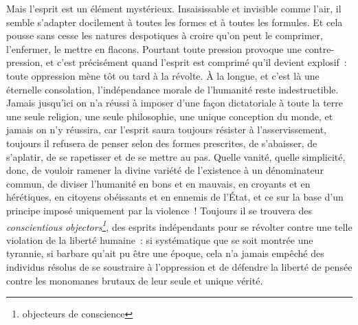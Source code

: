\documentclass[french,twoside]{book} %
\newcommand\foreign[1]{\emph{#1}}
\begin{document}
Mais l’esprit est un élément mystérieux. Insaisissable et invisible comme l’air, il semble s’adapter docilement à toutes les formes et à toutes les formules. Et cela pousse sans cesse les natures despotiques à croire qu’on peut le comprimer, l’enfermer, le mettre en flacons. Pourtant toute pression provoque une contre-pression, et c’est précisément quand l’esprit est comprimé qu’il devient explosif : toute oppression mène tôt ou tard à la révolte. À la longue, et c’est là une éternelle consolation, l’indépendance morale de l’humanité reste indestructible. Jamais jusqu’ici on n’a réussi à imposer d’une façon dictatoriale à toute la terre une seule religion, une seule philosophie, une unique conception du monde, et jamais on n’y réussira, car l’esprit saura toujours résister à l’asservissement, toujours il refusera de penser selon des formes prescrites, de s’abaisser, de s’aplatir, de se rapetisser et de se mettre au pas. Quelle vanité, quelle simplicité, donc, de vouloir ramener la divine variété de l’existence à un dénominateur commun, de diviser l’humanité en bons et en mauvais, en croyants et en hérétiques, en citoyens obéissants et en ennemis de l’État, et ce sur la base d’un principe imposé uniquement par la violence ! Toujours il se trouvera des \foreign{conscientious objectors\footnote{objecteurs de conscience}}, des esprits indépendants pour se révolter contre une telle violation de la liberté humaine : si systématique que se soit montrée une tyrannie, si barbare qu’ait pu être une époque, cela n’a jamais empêché des individus résolus de se soustraire à l’oppression et de défendre la liberté de pensée contre les monomanes brutaux de leur seule et unique vérité.\par
\end{document}
